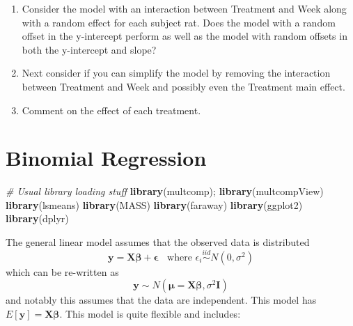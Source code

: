 \documentclass[]{book}
\newenvironment{Shaded}{\begin{snugshade}}{\end{snugshade}}
\newcommand{\KeywordTok}[1]{\textcolor[rgb]{0.13,0.29,0.53}{\textbf{{#1}}}}
\newcommand{\CommentTok}[1]{\textcolor[rgb]{0.56,0.35,0.01}{\textit{{#1}}}}
\newcommand{\NormalTok}[1]{{#1}}
\providecommand{\tightlist}{%
  \setlength{\itemsep}{0pt}\setlength{\parskip}{0pt}}
\theoremstyle{definition}
\theoremstyle{definition}
\theoremstyle{remark}
\begin{document}
\begin{enumerate}
  \begin{enumerate}
  \def\labelenumii{\alph{enumii}.}
  \tightlist
  \item
    Consider the model with an interaction between Treatment and Week
    along with a random effect for each subject rat. Does the model with
    a random offset in the y-intercept perform as well as the model with
    random offsets in both the y-intercept and slope?
  \item
    Next consider if you can simplify the model by removing the
    interaction between Treatment and Week and possibly even the
    Treatment main effect.\\
  \item
    Comment on the effect of each treatment.
  \end{enumerate}
\end{enumerate}

\chapter{Binomial Regression}\label{binomial-regression}

\begin{Shaded}
\begin{Highlighting}[]
\CommentTok{# Usual library loading stuff}
\KeywordTok{library}\NormalTok{(multcomp); }\KeywordTok{library}\NormalTok{(multcompView)}
\KeywordTok{library}\NormalTok{(lsmeans)}
\KeywordTok{library}\NormalTok{(MASS)}
\KeywordTok{library}\NormalTok{(faraway)}
\KeywordTok{library}\NormalTok{(ggplot2)}
\KeywordTok{library}\NormalTok{(dplyr)}
\end{Highlighting}
\end{Shaded}

The general linear model assumes that the observed data is distributed
\[\boldsymbol{y} = \boldsymbol{X\beta} + \boldsymbol{\epsilon} \;\; \textrm{ where } \epsilon_i \stackrel{iid}{\sim} N(0,\sigma^2)\]
which can be re-written as
\[\boldsymbol{y}\sim N\left(\boldsymbol{\mu}=\boldsymbol{X\beta},\sigma^{2}\boldsymbol{I}\right)\]
and notably this assumes that the data are independent. This model has
\(E\left[\boldsymbol{y}\right]=\boldsymbol{X\beta}\). This model is
quite flexible and includes:
\end{document}
